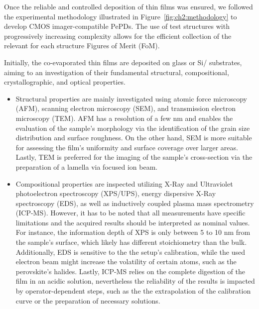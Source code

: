 Once the reliable and controlled deposition of  thin films was ensured, we followed the experimental methodology illustrated in Figure~\ref{fig:ch2:methodology} to develop CMOS imager-compatible PePDs. The use of test structures with progressively increasing complexity allows for the efficient collection of the relevant for each structure Figures of Merit (FoM). 

Initially, the co-evaporated  thin films are deposited on glass or Si/ substrates, aiming to an investigation of their fundamental structural, compositional, crystallographic, and optical properties. 

\begin{itemize}
    \item Structural properties are mainly investigated using atomic force microscopy (AFM), scanning electron microscopy (SEM), and transmission electron microscopy (TEM). AFM has a resolution of a few nm and enables the evaluation of the sample's morphology via the identification of the grain size distribution and surface roughness. On the other hand, SEM is more suitable for assessing the film's uniformity and surface coverage over larger areas. Lastly, TEM is preferred for the imaging of the sample's cross-section via the preparation of a lamella via focused ion beam. 
        
    \item  Compositional properties are inspected utilizing X-Ray and Ultraviolet photoelectron spectroscopy (XPS/UPS), energy dispersive X-Ray spectroscopy (EDS), as well as inductively coupled plasma mass spectrometry (ICP-MS). However, it has to be noted that all measurements have specific limitations and the acquired results should be interpreted as nominal values. For instance, the information depth of XPS is only between 5 to 10 nm from the sample's surface, which likely has different stoichiometry than the bulk. Additionally, EDS is sensitive to the the setup's calibration, while the used electron beam might increase the volatility of certain atoms, such as the perovskite's halides. Lastly, ICP-MS relies on the complete digestion of the film in an acidic solution, nevertheless the reliability of the results is impacted by operator-dependent steps, such as the the extrapolation of the calibration curve or the preparation of necessary solutions.
    

\end{itemize}
